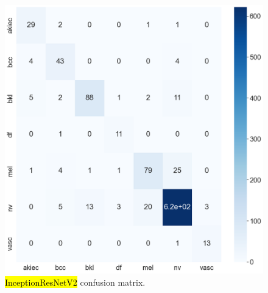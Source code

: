 \documentclass[sensors,article,accept,pdftex,moreauthors]{Definitions/mdpi}
\begin{document}
		\begin{figure}[H]
		\begin{minipage}{0.48\textwidth}
\centering
\includegraphics[width=1\linewidth]{Definitions/CM/irv2cm}
		\end{minipage}
\caption{\hl{InceptionResNetV2} %
 confusion matrix.}\label{fig:irv2cm}
	\end{figure}
	
\end{document}
